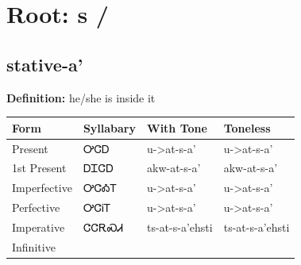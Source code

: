 \documentclass{article}%
\begin{document}
%
\normalsize%
\section*{Root: s / }%
\subsection*{stative-a'}%
\textbf{Definition: }%
he/she is inside it%
\\[0.5em]%
\begin{tabular}{|l|l|l|l|}%
\hline%
\textbf{Form}&\textbf{Syllabary}&\textbf{With Tone}&\textbf{Toneless}\\%
\hline%
Present&ᎤᏣᎠ&u{-}>at{-}s{-}a'&u{-}>at{-}s{-}a'\\%
1st Present&ᎠᏆᏣᎠ&akw{-}at{-}s{-}a'&akw{-}at{-}s{-}a'\\%
Imperfective&ᎤᏣᎣᎢ&u{-}>at{-}s{-}a'&u{-}>at{-}s{-}a'\\%
Perfective&ᎤᏣᎥᎢ&u{-}>at{-}s{-}a'&u{-}>at{-}s{-}a'\\%
Imperative&ᏣᏣᎡᏍᏗ&ts{-}at{-}s{-}a'ehsti&ts{-}at{-}s{-}a'ehsti\\%
Infinitive&&&\\%
\hline%
\end{tabular}%
\\[1em]%
\end{document}

